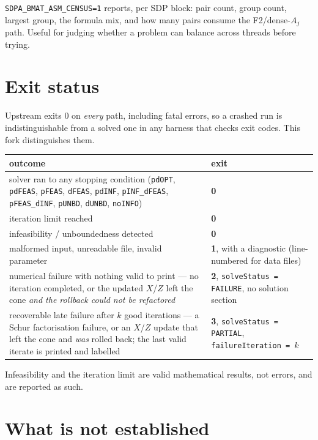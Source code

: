 \documentclass[11pt]{article}
\newcommand{\code}[1]{\texttt{#1}}
\begin{document}
\code{SDPA\_BMAT\_ASM\_CENSUS=1} reports, per SDP block: pair count, group count, largest group, the
formula mix, and how many pairs consume the F2/dense-$A_j$ path. Useful for judging whether a
problem can balance across threads before trying.

\section{Exit status}

Upstream exits $0$ on \emph{every} path, including fatal errors, so a crashed run is
indistinguishable from a solved one in any harness that checks exit codes. This fork distinguishes
them.

{\small
\begin{longtable}{@{}>{\raggedright\arraybackslash}p{10.4cm}>{\raggedright\arraybackslash}p{4.6cm}@{}}
\toprule
outcome & exit \\
\midrule
\endhead
solver ran to any stopping condition (\code{pdOPT}, \code{pdFEAS}, \code{pFEAS}, \code{dFEAS},
  \code{pdINF}, \code{pINF\_dFEAS}, \code{pFEAS\_dINF}, \code{pUNBD}, \code{dUNBD},
  \code{noINFO}) & \textbf{0} \\
iteration limit reached & \textbf{0} \\
infeasibility / unboundedness detected & \textbf{0} \\
malformed input, unreadable file, invalid parameter & \textbf{1}, with a diagnostic
  (line-numbered for data files) \\
numerical failure with nothing valid to print --- no iteration completed, or the updated $X$/$Z$
  left the cone \emph{and the rollback could not be refactored} & \textbf{2},
  \code{solveStatus = FAILURE}, no solution section \\
recoverable late failure after $k$ good iterations --- a Schur factorisation failure, or an
  $X$/$Z$ update that left the cone and \emph{was} rolled back; the last valid iterate is printed
  and labelled & \textbf{3}, \code{solveStatus = PARTIAL},
  \code{failureIteration = }$k$ \\
\bottomrule
\end{longtable}}

Infeasibility and the iteration limit are valid mathematical results, not errors, and are reported
as such.

\section{What is not established}
\end{document}
